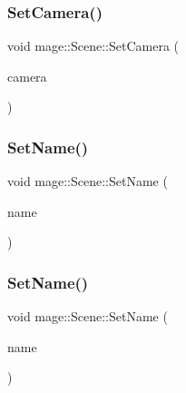 \subsubsection{\texorpdfstring{Set\+Camera()}{SetCamera()}}
{\footnotesize\ttfamily void mage\+::\+Scene\+::\+Set\+Camera (\begin{DoxyParamCaption}\item[{\hyperlink{namespacemage_a1e01ae66713838a7a67d30e44c67703e}{Shared\+Ptr}$<$ \hyperlink{classmage_1_1_camera_node}{Camera\+Node} $>$}]{camera }\end{DoxyParamCaption})}

\hypertarget{classmage_1_1_scene_a9b7c1c2f84cc3b3c5ff3de4f29d830e9}{}\label{classmage_1_1_scene_a9b7c1c2f84cc3b3c5ff3de4f29d830e9} 
\subsubsection{\texorpdfstring{Set\+Name()}{SetName()}\hspace{0.1cm}{\footnotesize\ttfamily [1/2]}}
{\footnotesize\ttfamily void mage\+::\+Scene\+::\+Set\+Name (\begin{DoxyParamCaption}\item[{const string \&}]{name }\end{DoxyParamCaption})}

\hypertarget{classmage_1_1_scene_a86b2e6e764ee134af1706f90603a6596}{}\label{classmage_1_1_scene_a86b2e6e764ee134af1706f90603a6596} 
\subsubsection{\texorpdfstring{Set\+Name()}{SetName()}\hspace{0.1cm}{\footnotesize\ttfamily [2/2]}}
{\footnotesize\ttfamily void mage\+::\+Scene\+::\+Set\+Name (\begin{DoxyParamCaption}\item[{string \&\&}]{name }\end{DoxyParamCaption})\hspace{0.3cm}{\ttfamily [noexcept]}}

\hypertarget{classmage_1_1_scene_a714dc33c04dc2b8e2cec93564905b174}{}\label{classmage_1_1_scene_a714dc33c04dc2b8e2cec93564905b174} 

